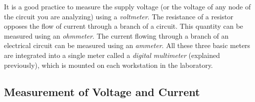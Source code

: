 It is a good practice to measure the supply voltage (or the voltage of any node of the circuit you are analyzing) using a \emph{voltmeter}. The resistance of a resistor opposes the flow of current through a branch of a circuit. This quantity can be measured using an \emph{ohmmeter}. The current flowing through a branch of an electrical circuit can be measured using an \emph{ammeter}. All these three basic meters are integrated into a single meter called a \emph{digital multimeter} (explained previously), which is mounted on each workstation in the laboratory. 



\subsection{Measurement of Voltage and Current}
\label{sec:voltageCurrentMeasurement}

